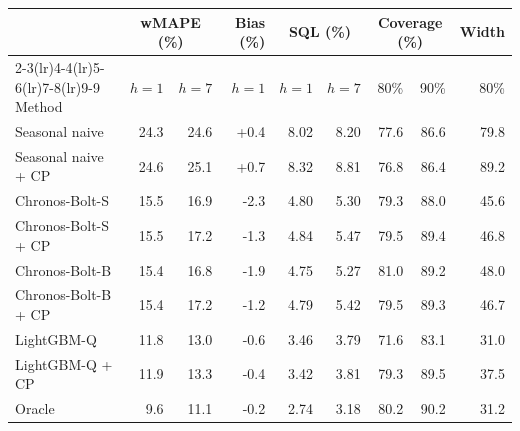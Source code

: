 \begin{tabular}{@{}lrrrrrrrr@{}}\toprule
 & \multicolumn{2}{c}{wMAPE (\%)} & Bias (\%) & \multicolumn{2}{c}{SQL (\%)} & \multicolumn{2}{c}{Coverage (\%)} & Width \\
\cmidrule(lr){2-3}\cmidrule(lr){4-4}\cmidrule(lr){5-6}\cmidrule(lr){7-8}\cmidrule(lr){9-9}
Method & $h{=}1$ & $h{=}7$ & $h{=}1$ & $h{=}1$ & $h{=}7$ & 80\% & 90\% & 80\% \\ \midrule
Seasonal naive & 24.3 & 24.6 & +0.4 & 8.02 & 8.20 & 77.6 & 86.6 & 79.8 \\
Seasonal naive + CP & 24.6 & 25.1 & +0.7 & 8.32 & 8.81 & 76.8 & 86.4 & 89.2 \\
\midrule
Chronos-Bolt-S & 15.5 & 16.9 & -2.3 & 4.80 & 5.30 & 79.3 & 88.0 & 45.6 \\
Chronos-Bolt-S + CP & 15.5 & 17.2 & -1.3 & 4.84 & 5.47 & 79.5 & 89.4 & 46.8 \\
Chronos-Bolt-B & 15.4 & 16.8 & -1.9 & 4.75 & 5.27 & 81.0 & 89.2 & 48.0 \\
Chronos-Bolt-B + CP & 15.4 & 17.2 & -1.2 & 4.79 & 5.42 & 79.5 & 89.3 & 46.7 \\
\midrule
LightGBM-Q & 11.8 & 13.0 & -0.6 & 3.46 & 3.79 & 71.6 & 83.1 & 31.0 \\
LightGBM-Q + CP & 11.9 & 13.3 & -0.4 & 3.42 & 3.81 & 79.3 & 89.5 & 37.5 \\
\midrule
Oracle & 9.6 & 11.1 & -0.2 & 2.74 & 3.18 & 80.2 & 90.2 & 31.2 \\
\bottomrule\end{tabular}
